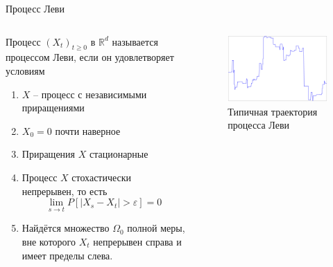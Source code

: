 \documentclass[8pt]{beamer}
\begin{document}
\begin{frame}{Процесс Леви}
  \begin{columns}
    \begin{definition}
      Процесс \( (X_t)_{t \geq 0} \) в \( \mathbb{R}^d \)
      называется процессом Леви, если он удовлетворяет условиям
      \begin{enumerate}
	\item \( X \) -- процесс с независимыми приращениями
	\item \( X_0 = 0 \) почти наверное
	\item Приращения \( X \) стационарные
	\item Процесс \( X \) стохастически непрерывен, то есть
	  \[
	    \lim_{s \to t} P [
	      | X_s - X_t | > \varepsilon
	    ] = 0
	  \]
	\item Найдётся множество \( \Omega_0 \) полной меры, вне
	  которого \( X_t \) непрерывен справа и имеет пределы
	  слева.
      \end{enumerate}
    \end{definition}

    \begin{figure}[h]
      \centering
      \includegraphics[width=\textwidth]{levy-sample-path}
      \caption{Типичная траектория процесса Леви}
      \label{fig:levy-sample-path}
    \end{figure}
  \end{columns}
\end{frame}
\end{document}
